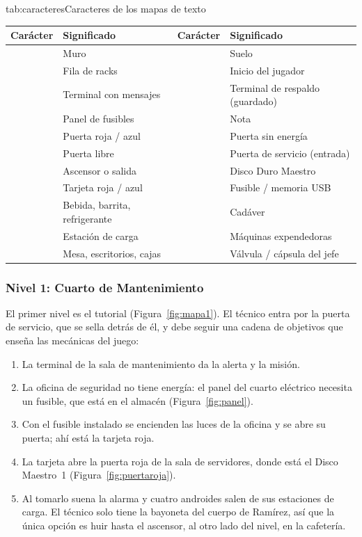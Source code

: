 \begin{TablaAPA}{tab:caracteres}{Caracteres de los mapas de texto}
\begin{tabularx}{\linewidth}{P{1.4cm}LP{1.4cm}L}
\toprule
Carácter & Significado & Carácter & Significado \\
\midrule
\cod{\#} & Muro &  & Suelo \\
\cod{=} \cod{|} & Fila de racks &  & Inicio del jugador \\
 & Terminal con mensajes &  & Terminal de respaldo (guardado) \\
 & Panel de fusibles &  & Nota \\
  & Puerta roja / azul &  & Puerta sin energía \\
 & Puerta libre &  & Puerta de servicio (entrada) \\
 & Ascensor o salida &  & Disco Duro Maestro \\
  & Tarjeta roja / azul &   & Fusible / memoria USB \\
   & Bebida, barrita, refrigerante &  & Cadáver \\
 & Estación de carga &   & Máquinas expendedoras \\
   & Mesa, escritorios, cajas &   & Válvula / cápsula del jefe \\
\bottomrule
\end{tabularx}
\end{TablaAPA}

\subsubsection{Nivel 1: Cuarto de Mantenimiento}

El primer nivel es el tutorial (Figura~\ref{fig:mapa1}). El técnico entra por la puerta de servicio,
que se sella detrás de él, y debe seguir una cadena de objetivos que enseña las mecánicas del juego:

\begin{enumerate}
  \item La terminal de la sala de mantenimiento da la alerta y la misión.
  \item La oficina de seguridad no tiene energía: el panel del cuarto eléctrico necesita un
        fusible, que está en el almacén (Figura~\ref{fig:panel}).
  \item Con el fusible instalado se encienden las luces de la oficina y se abre su puerta; ahí está
        la tarjeta roja.
  \item La tarjeta abre la puerta roja de la sala de servidores, donde está el Disco Maestro~1
        (Figura~\ref{fig:puertaroja}).
  \item Al tomarlo suena la alarma y cuatro androides salen de sus estaciones de carga. El técnico
        solo tiene la bayoneta del cuerpo de Ramírez, así que la única opción es huir hasta el
        ascensor, al otro lado del nivel, en la cafetería.
\end{enumerate}

